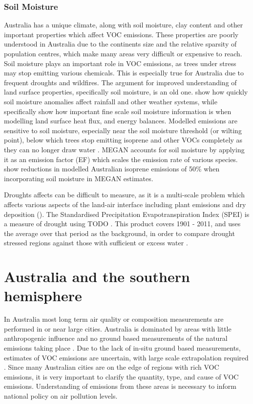     \subsubsection{Soil Moisture}
      \label{LR:Models:Uncert:SoilMoisture}
      Australia has a unique climate, along with soil moisture, clay content and other important properties which affect VOC emissions.
      These properties are poorly understood in Australia due to the continents size and the relative sparsity of population centres, which make many areas very difficult or expensive to reach.
      Soil moisture plays an important role in VOC emissions, as trees under stress may stop emitting various chemicals. 
      This is especially true for Australia due to frequent droughts and wildfires.
      The argument for improved understanding of land surface properties, specifically soil moisture, is an old one\citep{Mintz1982, Rowntree1983, Chen2001}. 
      \cite{Rowntree1983} show how quickly soil moisture anomalies affect rainfall and other weather systems, while \cite{Chen2001} specifically show how important fine scale soil moisture information is when modelling land surface heat flux, and energy balances.
      Modelled emissions are sensitive to soil moisture, especially near the soil moisture threshold (or wilting point), below which trees stop emitting isoprene and other VOCs completely as they can no longer draw water \citep{Bauwens2016}.
      MEGAN accounts for soil moisture by applying it as an emission factor (EF) which scales the emission rate of various species.
      \cite{Sindelarova2014} show reductions in modelled Australian isoprene emissions of 50\% when incorporating soil moisture in MEGAN estimates. 
      
      Droughts affects can be difficult to measure, as it is a multi-scale problem which affects various aspects of the land-air interface including plant emissions and dry deposition (\cite{Wang2017}).
      The Standardised Precipitation Evapotranspiration Index (SPEI) is a measure of drought using TODO \cite{SPEI_website}.
      This product covers 1901 - 2011, and uses the average over that period as the background, in order to compare drought stressed regions against those with sufficient or excess water \cite{SPEI_website}.
      
    
    
  
\section{Australia and the southern hemisphere}
\label{LR:Aus}
  In Australia most long term air quality or composition measurements are performed in or near large cities.
  Australia is dominated by areas with little anthropogenic influence and no ground based measurements of the natural emissions taking place \citep{VanDerA2008}.
  Due to the lack of in-situ ground based measurements, estimates of VOC emissions are uncertain, with large scale extrapolation required \cite{Millet2006}.
  Since many Australian cities are on the edge of regions with rich VOC emissions, it is very important to clarify the quantity, type, and cause of VOC emissions.
  Understanding of emissions from these areas is necessary to inform national policy on air pollution levels.
  
